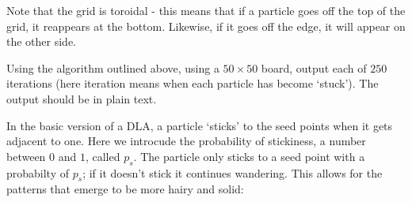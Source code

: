 \begin{center}
\end{center}

\noindent Note that the grid is toroidal - this means that if a particle goes off the top of the grid, it reappears at the bottom. Likewise, if it goes off the edge, it will appear on the other side.

\begin{exercise}
\label{ex:dla}
Using the algorithm outlined above, using a $50 \times 50$ board,
output each of $250$ iterations
(here iteration means when each particle has become `stuck').
The output should be in plain text.
\end{exercise}


In the basic version of a DLA, a particle `sticks' to the seed points when
it gets adjacent to one. Here we introcude the probability of stickiness,
a number between $0$ and $1$, called $p_s$. The particle only sticks
to a seed point with a probabilty of $p_s$; if
it doesn't stick it continues wandering. This allows for the patterns
that emerge to be more hairy and solid:

